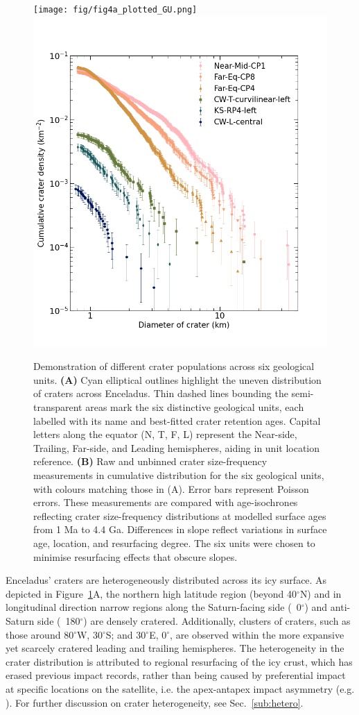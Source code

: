 \documentclass[preprint,11pt,3p,times,authoryear]{elsarticle}
\begin{document}
{\begin{figure}[ht!]
    \centering
    \texttt{[image: fig/fig4a\_plotted\_GU.png]}
    \includegraphics[width=0.5\linewidth]{fig/compare_fig4_icarus.png}
    \caption{Demonstration of different crater populations across six geological units.
        \textbf{(A)} Cyan elliptical outlines highlight the uneven distribution of craters across Enceladus. Thin dashed lines bounding the semi-transparent areas mark the six distinctive geological units, each labelled with its name and best-fitted crater retention ages. Capital letters along the equator (N, T, F, L) represent the Near-side, Trailing, Far-side, and Leading hemispheres, aiding in unit location reference.
        \textbf{(B)} Raw and unbinned crater size-frequency measurements in cumulative distribution for the six geological units, with colours matching those in (A). Error bars represent Poisson errors. These measurements are compared with age-isochrones reflecting crater size-frequency distributions at modelled surface ages from 1 Ma to 4.4 Ga. Differences in slope reflect variations in surface age, location, and resurfacing degree. The six units were chosen to minimise resurfacing effects that obscure slopes. }
    \label{fig:crater}
\end{figure}

Enceladus' craters are heterogeneously distributed across its icy surface. As depicted in Figure~\ref{fig:crater}A, the northern high latitude region (beyond 40$^\circ$N) and in longitudinal direction narrow regions along the Saturn-facing side (~0$^\circ$) and anti-Saturn side (~180$^\circ$) are densely cratered. Additionally, clusters of craters, such as those around 80$^\circ$W, 30$^\circ$S; and 30$^\circ$E, 0$^\circ$, are observed within the more expansive yet scarcely cratered leading and trailing hemispheres. The heterogeneity in the crater distribution is attributed to regional resurfacing of the icy crust, which has erased previous impact records, rather than being caused by preferential impact at specific locations on the satellite, i.e. the apex-antapex impact asymmetry (e.g. \citealt{Cuk2016}). For further discussion on crater heterogeneity, see Sec.~\ref{sub:hetero}.\\

}
\end{document}
